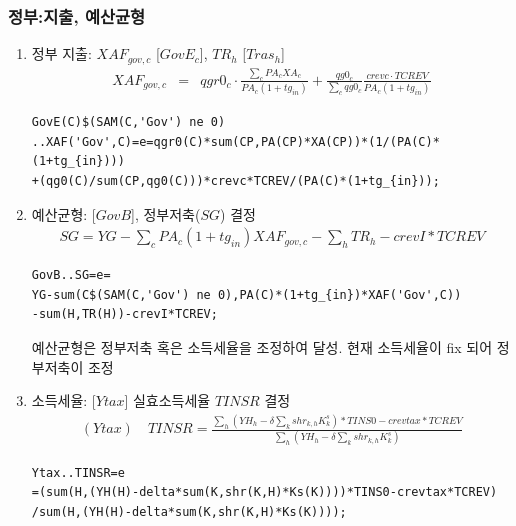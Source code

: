 \documentclass[10pt,compress,slidetop,%
			   hyperref={unicode},xcolor={svgnames},%
			   t]{beamer}
\begin{document}
\begin{frame}[fragile]
\frametitle{정부:지출, 예산균형}
\begin{scriptsize}
\begin{enumerate}
\item{정부 지출: $XAF_{gov,c}$ [$GovE_c$], $TR_h$ [$Tras_h$]}
\begin{eqnarray*}
XAF_{gov,c}&=&qgr0_c\cdot\frac{\sum_cPA_cXA_c}{PA_c(1+tg_{in})}+\frac{qg0_c}{\sum_c qg0_c}\frac{crevc\cdot TCREV}{PA_c(1+tg_{in})}
\end{eqnarray*}
\begin{verbatim}
GovE(C)$(SAM(C,'Gov') ne 0)
..XAF('Gov',C)=e=qgr0(C)*sum(CP,PA(CP)*XA(CP))*(1/(PA(C)*(1+tg_{in})))
+(qg0(C)/sum(CP,qg0(C)))*crevc*TCREV/(PA(C)*(1+tg_{in}));
\end{verbatim}
\item{예산균형: [$GovB$], 정부저축($SG$) 결정}
\begin{eqnarray*}
SG=YG-\sum_cPA_c(1+tg_{in})XAF_{gov,c}-\sum_hTR_h-crevI*TCREV
\end{eqnarray*}

\begin{verbatim}
GovB..SG=e=
YG-sum(C$(SAM(C,'Gov') ne 0),PA(C)*(1+tg_{in})*XAF('Gov',C))
-sum(H,TR(H))-crevI*TCREV;
\end{verbatim}
예산균형은 정부저축 혹은 소득세율을 조정하여 달성. 현재 소득세율이 fix 되어 정부저축이 조정

\item{소득세율: [$Ytax$] 실효소득세율 $TINSR$ 결정 }
\begin{eqnarray*}
(Ytax)\quad TINSR=\frac{\sum_h(YH_h-\delta\sum_k shr_{k,h}K^s_k)*TINS0-crevtax*TCREV}{\sum_h(YH_h-\delta\sum_k shr_{k,h}K^s_k)}
\end{eqnarray*}
\begin{verbatim}
Ytax..TINSR=e
=(sum(H,(YH(H)-delta*sum(K,shr(K,H)*Ks(K))))*TINS0-crevtax*TCREV)
/sum(H,(YH(H)-delta*sum(K,shr(K,H)*Ks(K))));
\end{verbatim}

\end{enumerate}
\end{scriptsize}
\end{frame}


\end{document}
